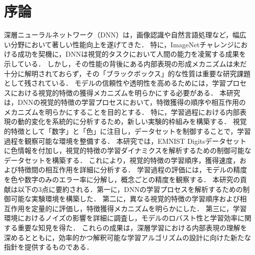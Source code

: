 \chapter{序論}
深層ニューラルネットワーク（DNN）は，画像認識や自然言語処理など，幅広い分野において著しい性能向上を遂げてきた．
特に，ImageNetチャレンジにおける成功を契機に，DNNは視覚的タスクにおいて人間の能力を凌駕する成果を示している\cite{ILSVRC15}．
しかし，その性能の背後にある内部表現の形成メカニズムは未だ十分に解明されておらず，その「ブラックボックス」的な性質は重要な研究課題として残されている．
モデルの信頼性や透明性を高めるためには，学習プロセスにおける視覚的特徴の獲得メカニズムを明らかにする必要がある．
本研究は，DNNの視覚的特徴の学習プロセスにおいて，特徴獲得の順序や相互作用のメカニズムを明らかにすることを目的とする．
特に，学習過程における内部表現の動的変化を系統的に分析するため，新しい実験的枠組みを構築する．
視覚的特徴として「数字」と「色」に注目し，データセットを制御することで，学習過程を観察可能な環境を整備する．
本研究では，EMNIST Digitsデータセットに色情報を付加し，視覚的特徴の学習ダイナミクスを解析するための制御可能なデータセットを構築する．
これにより，視覚的特徴の学習順序，獲得速度，および特徴間の相互作用を詳細に分析する．
学習過程の評価には，モデルの精度を色や数字のみのエラー率に分解し，概念ごとの精度を観察する．
本研究の貢献は以下の3点に要約される．第一に，DNNの学習プロセスを解析するための制御可能な実験環境を構築した．
第二に，異なる視覚的特徴の学習順序および相互作用を定量的に評価し，特徴獲得メカニズムを明らかにした．
第三に，学習環境におけるノイズの影響を詳細に調査し，モデルのロバスト性と学習効率に関する重要な知見を得た．
これらの成果は，深層学習における内部表現の理解を深めるとともに，効率的かつ解釈可能な学習アルゴリズムの設計に向けた新たな指針を提供するものである．
\newpage

